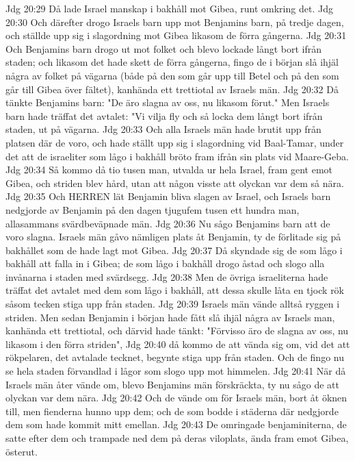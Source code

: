 Jdg 20:29  Då lade Israel manskap i bakhåll mot Gibea, runt omkring det.
Jdg 20:30  Och därefter drogo Israels barn upp mot Benjamins barn, på tredje dagen, och ställde upp sig i slagordning mot Gibea likasom de förra gångerna.
Jdg 20:31  Och Benjamins barn drogo ut mot folket och blevo lockade långt bort ifrån staden; och likasom det hade skett de förra gångerna, fingo de i början slå ihjäl några av folket på vägarna (både på den som går upp till Betel och på den som går till Gibea över fältet), kanhända ett trettiotal av Israels män.
Jdg 20:32  Då tänkte Benjamins barn: "De äro slagna av oss, nu likasom förut." Men Israels barn hade träffat det avtalet: "Vi vilja fly och så locka dem långt bort ifrån staden, ut på vägarna.
Jdg 20:33  Och alla Israels män hade brutit upp från platsen där de voro, och hade ställt upp sig i slagordning vid Baal-Tamar, under det att de israeliter som lågo i bakhåll bröto fram ifrån sin plats vid Maare-Geba.
Jdg 20:34  Så kommo då tio tusen man, utvalda ur hela Israel, fram gent emot Gibea, och striden blev hård, utan att någon visste att olyckan var dem så nära.
Jdg 20:35  Och HERREN lät Benjamin bliva slagen av Israel, och Israels barn nedgjorde av Benjamin på den dagen tjugufem tusen ett hundra man, allasammans svärdbeväpnade män.
Jdg 20:36  Nu sågo Benjamins barn att de voro slagna. Israels män gåvo nämligen plats åt Benjamin, ty de förlitade sig på bakhållet som de hade lagt mot Gibea.
Jdg 20:37  Då skyndade sig de som lågo i bakhåll att falla in i Gibea; de som lågo i bakhåll drogo åstad och slogo alla invånarna i staden med svärdsegg.
Jdg 20:38  Men de övriga israeliterna hade träffat det avtalet med dem som lågo i bakhåll, att dessa skulle låta en tjock rök såsom tecken stiga upp från staden.
Jdg 20:39  Israels män vände alltså ryggen i striden. Men sedan Benjamin i början hade fått slå ihjäl några av Israels man, kanhända ett trettiotal, och därvid hade tänkt: "Förvisso äro de slagna av oss, nu likasom i den förra striden",
Jdg 20:40  då kommo de att vända sig om, vid det att rökpelaren, det avtalade tecknet, begynte stiga upp från staden. Och de fingo nu se hela staden förvandlad i lågor som slogo upp mot himmelen.
Jdg 20:41  När då Israels män åter vände om, blevo Benjamins män förskräckta, ty nu sågo de att olyckan var dem nära.
Jdg 20:42  Och de vände om för Israels män, bort åt öknen till, men fienderna hunno upp dem; och de som bodde i städerna där nedgjorde dem som hade kommit mitt emellan.
Jdg 20:43  De omringade benjaminiterna, de satte efter dem och trampade ned dem på deras viloplats, ända fram emot Gibea, österut.

